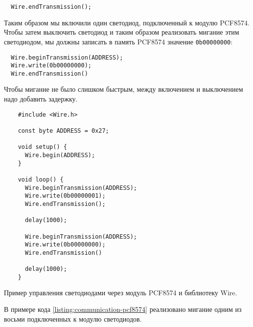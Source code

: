 \documentclass[../sparc.tex]{subfiles}
\begin{document}
\begin{verbatim}
  Wire.endTransmission();
\end{verbatim}

Таким образом мы включили один светодиод, подключенный к модулю PCF8574.  Чтобы
затем выключить светодиод и таким образом реализовать мигание этим светодиодом,
мы должны записать в память PCF8574 значение \texttt{0b00000000}:

\begin{verbatim}
  Wire.beginTransmission(ADDRESS);
  Wire.write(0b00000000);
  Wire.endTransmission()
\end{verbatim}

Чтобы мигание не было слишком быстрым, между включением и выключением надо
добавить задержку.

\begin{listing}[H]
  \begin{verbatim}
    #include <Wire.h>

    const byte ADDRESS = 0x27;

    void setup() {
      Wire.begin(ADDRESS);
    }

    void loop() {
      Wire.beginTransmission(ADDRESS);
      Wire.write(0b00000001);
      Wire.endTransmission();

      delay(1000);

      Wire.beginTransmission(ADDRESS);
      Wire.write(0b00000000);
      Wire.endTransmission()

      delay(1000);
    }
  \end{verbatim}
  \label{listing:communication-pcf8574}
  \caption{Пример управления светодиодами через модуль PCF8574 и библиотеку
    Wire.}
\end{listing}

В примере кода \ref{listing:communication-pcf8574} реализовано мигание одним из
восьми подключенных к модулю светодиодов.
\end{document}
